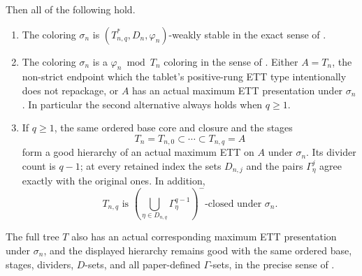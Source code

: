 \begin{lemma}
Then all of the following hold.
\begin{enumerate}
\item The coloring $\sigma_n$ is
$(T_{n,q}^{*},D_n,\varphi_n)$-weakly stable in the exact sense of
.
\item The coloring $\sigma_n$ is a
$\varphi_n\bmod T_n$ coloring in the sense of .
Either $A=T_n$, the non-strict endpoint which the tablet's positive-rung
ETT type intentionally does not repackage, or $A$ has an actual maximum
ETT presentation under $\sigma_n$.  In particular the second alternative
always holds when $q\geq1$.
\item If $q\geq1$, the same ordered base core and closure and the
stages
\[
 T_n=T_{n,0}\subset\cdots\subset T_{n,q}=A
\]
form a good hierarchy of an actual maximum ETT on $A$ under
$\sigma_n$.  Its divider count is $q-1$; at every retained index the
sets $D_{n,j}$ and the pairs $\Gamma^j_\eta$ agree exactly with the
original ones.  In addition,
\[
 T_{n,q}\text{ is }
 \left(\bigcup_{\eta\in D_{n,q}}\Gamma^{q-1}_\eta\right)^{-}
 \text{-closed under }\sigma_n.                              \tag{M}
\]
\end{enumerate}
The full tree $T$ also has an actual corresponding maximum ETT
presentation under $\sigma_n$, and the displayed hierarchy remains good
with the same ordered base, stages, dividers, $D$-sets, and all
paper-defined $\Gamma$-sets, in the precise sense of
.
\end{lemma}
